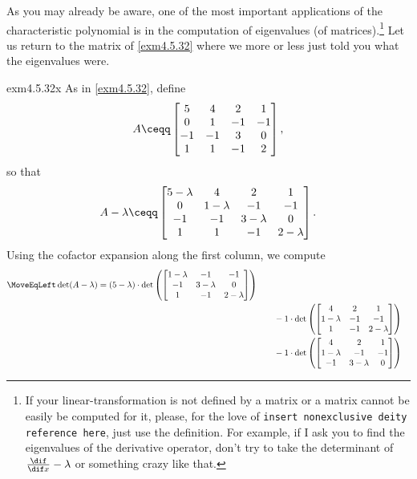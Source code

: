 As you may already be aware, one of the most important applications of the characteristic polynomial is in the computation of eigenvalues (of matrices).\footnote{If your linear-transformation is not defined by a matrix or a matrix cannot be easily be computed for it, please, for the love of \texttt{insert nonexclusive deity reference here}, just use the definition.  For example, if I ask you to find the eigenvalues of the derivative operator, don't try to take the determinant of $\frac{\dif}{\dif x}-\lambda$ or something crazy like that.}  Let us return to the matrix of \cref{exm4.5.32} where we more or less just told you what the eigenvalues were.
\begin{exm}{}{exm4.5.32x}
	As in \cref{exm4.5.32}, define
	\begin{equation}
		A\ceqq \begin{bmatrix}5 & 4 & 2 & 1 \\ 0 & 1 & -1 & -1 \\ -1 & -1 & 3 & 0 \\ 1 & 1 & -1 & 2\end{bmatrix},
	\end{equation}
	so that
	\begin{equation}
		A-\lambda \ceqq \begin{bmatrix}5-\lambda & 4 & 2 & 1 \\ 0 & 1-\lambda & -1 & -1 \\ -1 & -1 & 3-\lambda & 0 \\ 1 & 1 & -1 & 2-\lambda \end{bmatrix}.
	\end{equation}
	Using the cofactor expansion along the first column, we compute
	{\scriptsize
	\begin{equation*}
		\begin{split}
			\MoveEqLeft
			\det (A-\lambda )=(5-\lambda )\cdot \det \left( \begin{bmatrix}1-\lambda & -1 & -1 \\ -1 & 3-\lambda & 0 \\ 1 & -1 & 2-\lambda \end{bmatrix}\right) \\ & \qquad -1\cdot \det \left( \begin{bmatrix}4 & 2 & 1 \\ 1-\lambda & -1 & -1 \\ 1 & -1 & 2-\lambda \end{bmatrix}\right) \\ & \qquad -1\cdot \det \left( \begin{bmatrix}4 & 2 & 1 \\ 1-\lambda & -1 & -1 \\ -1 & 3-\lambda & 0\end{bmatrix}\right) \\

\end{split}
\end{equation*}}
\end{exm}
